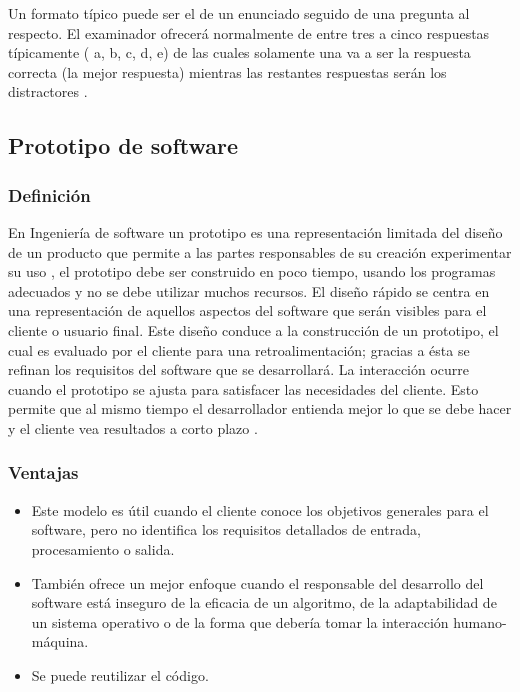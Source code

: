 Un formato típico puede ser el de un enunciado seguido de una pregunta al respecto. El examinador ofrecerá normalmente de entre tres a cinco respuestas típicamente ( a, b, c, d, e) de las cuales solamente una va a ser la respuesta correcta (la mejor respuesta) mientras las restantes respuestas serán los distractores \citep{salkind}.
\vskip 1cm 


\subsection{Prototipo de software}

\subsubsection{Definición}

En Ingeniería de software un prototipo es una representación limitada del diseño de un producto que permite a las partes responsables de su creación experimentar su uso \citep{pressman_troya}, el prototipo debe ser construido en poco tiempo, usando los programas adecuados y no se debe utilizar muchos recursos.
\vskip 0.3cm
El diseño rápido se centra en una representación de aquellos aspectos del software que serán visibles para el cliente o usuario final. Este diseño conduce a la construcción de un prototipo, el cual es evaluado por el cliente para una retroalimentación; gracias a ésta se refinan los requisitos del software que se desarrollará. La interacción ocurre cuando el prototipo se ajusta para satisfacer las necesidades del cliente. Esto permite que al mismo tiempo el desarrollador entienda mejor lo que se debe hacer y el cliente vea resultados a corto plazo \citep{pressman_troya}.


\subsubsection{Ventajas}

\begin{itemize}
	\item Este modelo es útil cuando el cliente conoce los objetivos generales para el software, pero no identifica los requisitos detallados de entrada, procesamiento o salida.
	\item También ofrece un mejor enfoque cuando el responsable del desarrollo del software está inseguro de la eficacia de un algoritmo, de la adaptabilidad de un sistema operativo o de la forma que debería tomar la interacción humano-máquina.
	\item Se puede reutilizar el código.
\end{itemize}

